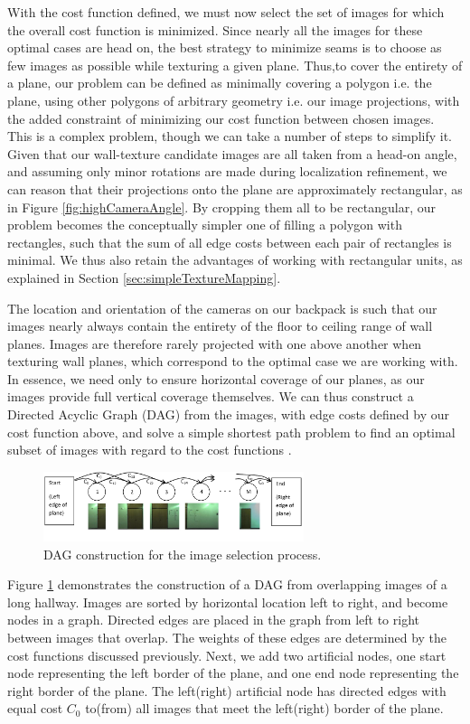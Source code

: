 \documentclass[10pt,twocolumn,letterpaper]{article}
\begin{document}
With the cost function defined, we must now select the set of images
for which the overall cost function is minimized. Since nearly all the
images for these optimal cases are head on, the best strategy to
minimize seams is to choose as few images as possible while texturing
a given plane. Thus,to cover the entirety of a plane, our problem can
be defined as minimally covering a polygon i.e. the plane, using other
polygons of arbitrary geometry i.e. our image projections, with the
added constraint of minimizing our cost function between chosen
images.  This is a complex problem, though we can take a number of
steps to simplify it. Given that our wall-texture candidate images are
all taken from a head-on angle, and assuming only minor rotations are
made during localization refinement, we can reason that their
projections onto the plane are approximately rectangular, as in Figure
\ref{fig:highCameraAngle}. By cropping them all to be rectangular, our
problem becomes the conceptually simpler one of filling a polygon with
rectangles, such that the sum of all edge costs between each pair of
rectangles is minimal. We thus also retain the advantages of working
with rectangular units, as explained in Section
\ref{sec:simpleTextureMapping}.

The location and orientation of the cameras on our backpack is such
that our images nearly always contain the entirety of the floor to
ceiling range of wall planes. Images are therefore rarely projected
with one above another when texturing wall planes, which correspond to
the optimal case we are working with.  In essence, we need only to
ensure horizontal coverage of our planes, as our images provide full
vertical coverage themselves. We can thus construct a Directed Acyclic
Graph (DAG) from the images, with edge costs defined by our cost
function above, and solve a simple shortest path problem to find an
optimal subset of images with regard to the cost functions
\cite{dijkstra}.

\begin{figure}
  \centering
  \includegraphics[width=3in]{dagCreation.pdf}
  \caption{DAG construction for the image selection process.}
  \label{fig:dagCreation}
\end{figure}

Figure \ref{fig:dagCreation} demonstrates the construction of a DAG
from overlapping images of a long hallway. Images are sorted by
horizontal location left to right, and become nodes in a
graph. Directed edges are placed in the graph from left to right
between images that overlap. The weights of these edges are determined
by the cost functions discussed previously. Next, we add two
artificial nodes, one start node representing the left border of the
plane, and one end node representing the right border of the
plane. The left(right) artificial node has directed edges with equal
cost $C_0$ to(from) all images that meet the left(right) border of the
plane.
\end{document}
